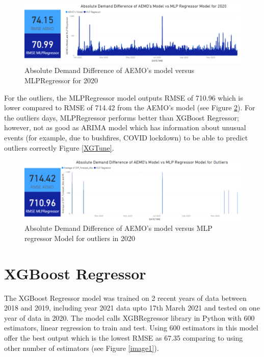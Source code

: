 \documentclass[mstat,12pt]{unswthesis}
\begin{document}
\begin{figure}[H]
\includegraphics[width=140mm]{image4.png}
\caption{Absolute Demand Difference of AEMO's model versus MLPRegressor for 2020}
\label{image333}
\end{figure}

For the outliers, the MLPRegressor model outputs RMSE of 710.96 which is
lower compared to RMSE of 714.42 from the AEMO's model (see Figure
\ref{image13}). For the outliers days, MLPRegressor performs better than
XGBoost Regressor; however, not as good as ARIMA model which has
information about unusual events (for example, due to bushfires, COVID
lockdown) to be able to predict outliers correctly Figure \ref{XGTune}.

\begin{figure}[H]
\includegraphics[width=140mm]{image13.png}
\caption{Absolute Demand Difference of AEMO's model versus MLP regressor Model for outliers in 2020}
\label{image13}
\end{figure}

\hypertarget{xgboost-regressor}{%
\section{XGBoost Regressor}\label{xgboost-regressor}}

The XGBoost Regressor model was trained on 2 recent years of data
between 2018 and 2019, including year 2021 data upto 17th March 2021 and
tested on one year of data in 2020. The model calls XGBRegressor library
in Python with 600 estimators, linear regression to train and test.
Using 600 estimators in this model offer the best output which is the
lowest RMSE as 67.35 comparing to using other number of estimators (see
Figure \ref{image1}).
\end{document}

